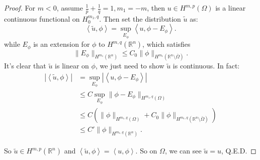 \documentclass[a4paper]{ctexart}
\newcommand{\innerprod}[2]{\left<#1,#2\right>}
\begin{document}
\begin{proof}
    For $m<0$, assume $\frac{1}{p}+\frac{1}{q}=1,m_{1}=-m$, then $u\in H^{m,p}(\Omega)$ is a linear continuous functional on $H_{0}^{m_{1},q}$. Then set the distribution $\tilde{u}$ as:
    \begin{equation}
        \innerprod{\tilde{u}}{\phi}=\sup_{E_{\phi}}\innerprod{u}{\phi-E_{\phi}}.
    \end{equation}
    while $E_{\phi}$ is an extension for $\phi$ to $H^{m,q}(\mathbb{R}^{n})$, which satisfies
    \begin{equation}
        \|E_{\phi}\|_{H^{m_{1}}(\mathbb{R}^{n})}\le C_{0}\|\phi\|_{H^{m_{1}}(\mathbb{R}^{n}\setminus\bar{\Omega})}.
    \end{equation}
    It's clear that $\tilde{u}$ is linear on $\phi$, we just need to show $\tilde{u}$ is continuous. In fact:
    \begin{equation}
        \begin{aligned}
            |\innerprod{\tilde{u}}{\phi}|&=\sup_{E_{\phi}}|\innerprod{u}{\phi-E_{\phi}}|\\
            &\le C\sup_{E_{\phi}}\|\phi-E_{\phi}\|_{H^{m_{1},q}(\Omega)}\\
            &\le C(\|\phi\|_{H^{m_{1},q}(\Omega)}+C_{0}\|\phi\|_{H^{m_{1},q}(\mathbb{R}^{n}\setminus\bar{\Omega})})\\
            &\le C'\|\phi\|_{H^{m_{1},q}(\mathbb{R}^{n})}.
        \end{aligned}
    \end{equation}

    So $\tilde{u}\in H^{m,p}(\mathbb{R}^{n})$ and $\innerprod{\tilde{u}}{\phi}=\innerprod{u}{\phi}$. So on $\Omega$, we can see $\tilde{u}=u$, Q.E.D.
\end{proof}
\end{document}
